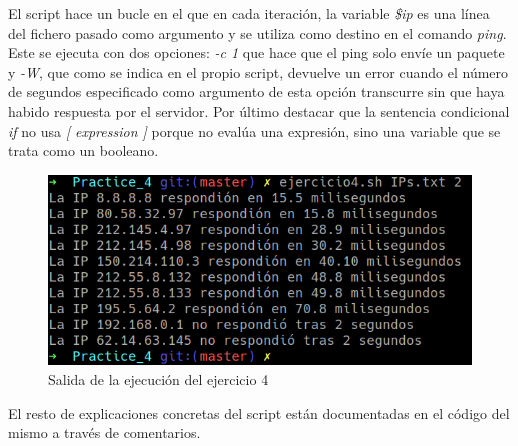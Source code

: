 \documentclass[12pt,a4paper]{article}
\begin{document}
El script hace un bucle en el que en cada iteración, la variable \emph{\$ip} es una línea del fichero pasado como argumento y se utiliza como destino en el comando \emph{ping}. Este se ejecuta con dos opciones: \emph{-c 1} que hace que el ping solo envíe un paquete y \emph{-W}, que como se indica en el propio script, devuelve un error cuando el número de segundos especificado como argumento de esta opción transcurre sin que haya habido respuesta por el servidor. Por último destacar que la sentencia condicional \emph{if} no usa \emph{[ expression ]} porque no evalúa una expresión, sino una variable que se trata como un booleano.

\begin{figure}[ht]
	\centering
	\includegraphics{images/ejercicio4.png}
	\caption{Salida de la ejecución del ejercicio 4}
\end{figure}

El resto de explicaciones concretas del script están documentadas en el código del mismo a través de comentarios.
\end{document}
